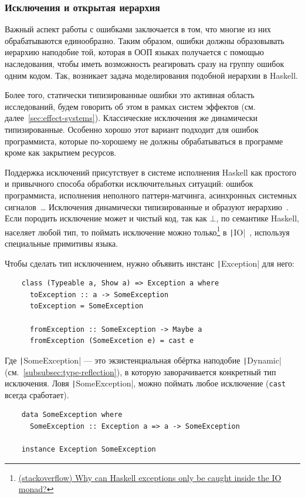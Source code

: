 \subsubsection{Исключения и открытая иерархия}

Важный аспект работы с ошибками заключается в том, что многие из них обрабатываются единообразно.
Таким образом, ошибки должны образовывать иерархию наподобие той, которая в ООП языках получается с помощью наследования, чтобы иметь возможность реагировать сразу на группу ошибок одним кодом.
Так, возникает задача моделирования подобной иерархии в Haskell.

Более того, статически типизированные ошибки это активная область исследований, будем говорить об этом в рамках систем эффектов (см. далее~\ref{sec:effect-systems}).
Классические исключения же динамически типизированные.
Особенно хорошо этот вариант подходит для ошибок программиста, которые по-хорошему не должны обрабатываться в программе кроме как закрытием ресурсов. %

Поддержка исключений присутствует в системе исполнения Haskell как простого и привычного способа обработки исключительных ситуаций: ошибок программиста, исполнения неполного паттерн-матчинга, асинхронных системных сигналов~\cite{marlow2001asynchronous}\ldots
Исключения динамически типизированные и образуют иерархию~\cite{marlow2006extensible}.
Если породить исключение может и чистый код, так как $\bot$, по семантике Haskell, населяет любой тип, то поймать исключение можно только\footnote{\href{https://stackoverflow.com/questions/3642793/why-can-haskell-exceptions-only-be-caught-inside-the-io-monad}{(stackoverflow) Why can Haskell exceptions only be caught inside the IO monad?}} в \texttt|IO|~\cite{jones2001tackling}, используя специальные примитивы языка.

Чтобы сделать тип исключением, нужно объявить инстанс \texttt|Exception| для него:
\begin{verbatim}
    class (Typeable a, Show a) => Exception a where
      toException :: a -> SomeException
      toException = SomeException

      fromException :: SomeException -> Maybe a
      fromException (SomeExcetion e) = cast e
\end{verbatim}
Где \texttt|SomeException| --- это экзистенциальная обёртка наподобие \texttt|Dynamic| (см.\ \ref{subsubsec:type-reflection}), в которую заворачивается конкретный тип исключения.
Ловя \texttt|SomeException|, можно поймать любое исключение (\texttt{cast} всегда сработает).
\begin{verbatim}
    data SomeException where
      SomeException :: Exception a => a -> SomeException

    instance Exception SomeException
\end{verbatim}

